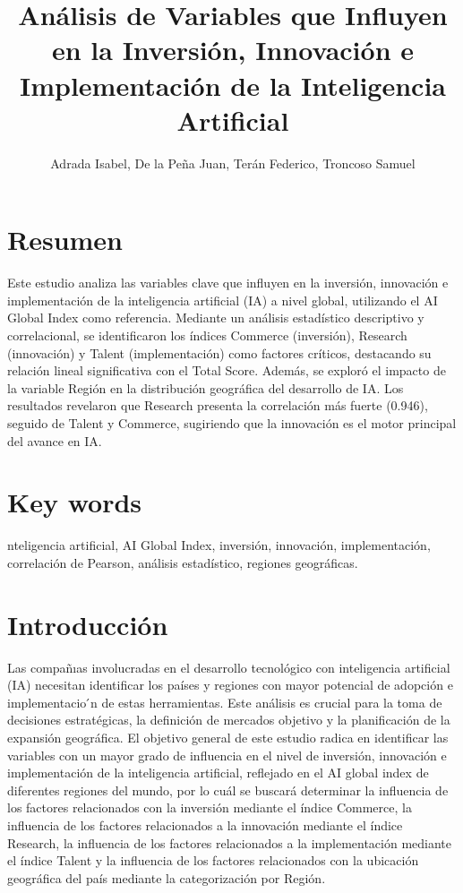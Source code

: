 \documentclass[
]{article}
\title{Análisis de Variables que Influyen en la Inversión, Innovación e
Implementación de la Inteligencia Artificial}
\author{Adrada Isabel, De la Peña Juan, Terán Federico, Troncoso Samuel}
\date{}
\begin{document}
\maketitle

\begin{multicols}{2}

\section{Resumen}
Este estudio analiza las variables clave que influyen en la inversión, innovación e implementación de la inteligencia artificial (IA) a nivel global, utilizando el AI Global Index como referencia. Mediante un análisis estadístico descriptivo y correlacional, se identificaron los índices Commerce (inversión), Research (innovación) y Talent (implementación) como factores críticos, destacando su relación lineal significativa con el Total Score. Además, se exploró el impacto de la variable Región en la distribución geográfica del desarrollo de IA. Los resultados revelaron que Research presenta la correlación más fuerte (0.946), seguido de Talent y Commerce, sugiriendo que la innovación es el motor principal del avance en IA.


\section{Key words}
nteligencia artificial, AI Global Index, inversión, innovación, implementación, correlación de Pearson, análisis estadístico, regiones geográficas.

\section{Introducción}
Las compañıas involucradas en el desarrollo tecnológico con inteligencia artificial (IA) necesitan identificar los países y regiones con mayor potencial de adopción e implementacio ́n de estas herramientas. Este análisis es crucial para la toma de decisiones estratégicas, la definición de mercados objetivo y la planificación de la expansión geográfica. El objetivo general de este estudio radica en identificar las variables con un mayor grado de influencia en el nivel de inversión, innovación e implementación de la inteligencia artificial, reflejado en el AI global index de diferentes regiones del mundo, por lo cuál se buscará determinar la influencia de los factores relacionados con la inversión mediante el índice Commerce, la influencia de los factores relacionados a la innovación mediante el índice Research, la influencia de los factores relacionados a la implementación mediante el índice Talent y la influencia de los factores relacionados con la ubicación geográfica del país mediante la categorización por Región.





\end{multicols}
\end{document}
